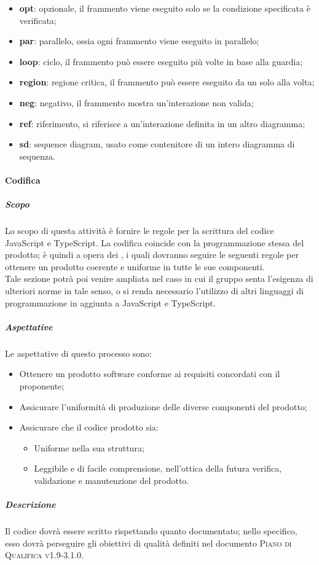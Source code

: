 \documentclass[../norme-di-progetto.tex]{subfiles}
\begin{document}
\begin{itemize}
\begin{itemize}
\begin{itemize}
      \item \textbf{opt}: opzionale, il frammento viene eseguito solo se la condizione specificata è verificata;
      \item \textbf{par}: parallelo, ossia ogni frammento viene eseguito in parallelo;
      \item \textbf{loop}: ciclo, il frammento può essere eseguito più volte in base alla guardia;
      \item \textbf{region}: regione critica, il frammento può essere eseguito da un solo  alla volta;
      \item \textbf{neg}: negativo, il frammento mostra un'interazione non valida;
      \item \textbf{ref}: riferimento, si riferisce a un'interazione definita in un altro diagramma;
      \item \textbf{sd}: sequence diagram, usato come contenitore di un intero diagramma di sequenza.
    \end{itemize}
  \end{itemize}
\end{itemize}

\paragraph{Codifica}
\subparagraph{Scopo}
Lo scopo di questa attività è fornire le regole per la scrittura del codice JavaScript e TypeScript. La codifica coincide con la programmazione stessa del prodotto; è quindi a opera dei , i quali dovranno seguire le seguenti regole per ottenere un prodotto coerente e uniforme in tutte le sue componenti. \\
Tale sezione potrà poi venire ampliata nel caso in cui il gruppo senta l'esigenza di ulteriori norme in tale senso, o si renda necessario l'utilizzo di altri linguaggi di programmazione in aggiunta a JavaScript e TypeScript.
\subparagraph{Aspettative}
Le aspettative di questo processo sono:
\begin{itemize}
  \item Ottenere un prodotto software conforme ai requisiti concordati con il proponente;
  \item Assicurare l'uniformità di produzione delle diverse componenti del prodotto;
  \item Assicurare che il codice prodotto sia:
  \begin{itemize}
    \item Uniforme nella sua struttura;
    \item Leggibile e di facile comprensione, nell'ottica della futura verifica, validazione e manutenzione del prodotto.
  \end{itemize}
\end{itemize}
\subparagraph{Descrizione}
Il codice dovrà essere scritto rispettando quanto documentato; nello specifico, esso dovrà perseguire gli obiettivi di qualità definiti nel documento \textsc{Piano di Qualifica v1.9-3.1.0}.
\end{document}
